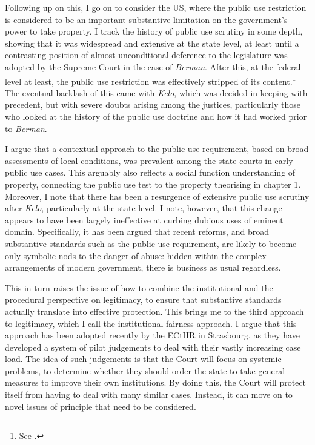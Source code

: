 Following up on this, I go on to consider the US, where the public use restriction is considered to be an important substantive limitation on the government's power to take property. I track the history of public use scrutiny in some depth, showing that it was widespread and extensive at the state level, at least until a contrasting position of almost unconditional deference to the legislature was adopted by the Supreme Court in the case of {\it Berman}. After this, at the federal level at least, the public use restriction was effectively stripped of its content.\footnote{See \cite{berman54}.} The eventual backlash of this came with {\it Kelo}, which was decided in keeping with precedent, but with severe doubts arising among the justices, particularly those who looked at the history of the public use doctrine and how it had worked prior to {\it Berman}.

I argue that a contextual approach to the public use requirement, based on broad assessments of local conditions, was prevalent among the state courts in early public use cases. This arguably also reflects a social function understanding of property, connecting the public use test to the property theorising in chapter 1. Moreover, I note that there has been a resurgence of extensive public use scrutiny after {\it Kelo}, particularly at the state level. I note, however, that this change appears to have been largely ineffective at curbing dubious uses of eminent domain. Specifically, it has been argued that recent reforms, and broad substantive standards such as the public use requirement, are likely to become only symbolic nods to the danger of abuse: hidden within the complex arrangements of modern government, there is business as usual regardless.

This in turn raises the issue of how to combine the institutional and the procedural perspective on legitimacy, to ensure that substantive standards actually translate into effective protection. This brings me to the third approach to legitimacy, which I call the institutional fairness approach. I argue that this approach has been adopted recently by the ECtHR in Strasbourg, as they have developed a system of pilot judgements to deal with their vastly increasing case load. The idea of such judgements is that the Court will focus on systemic problems, to determine whether they should order the state to take general measures to improve their own institutions. By doing this, the Court will protect itself from having to deal with many similar cases. Instead, it can move on to novel issues of principle that need to be considered.

